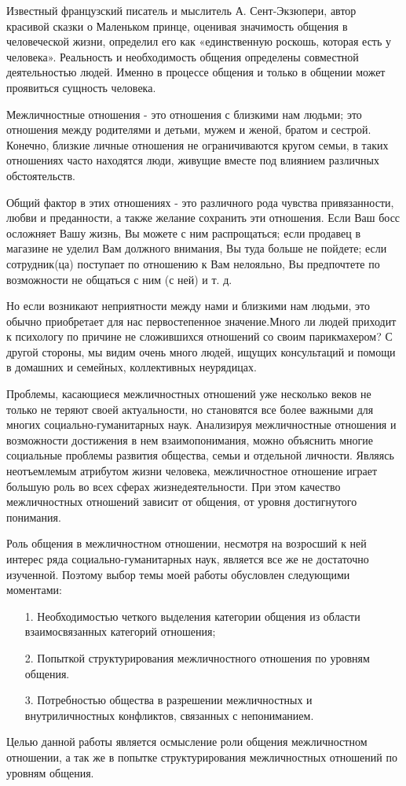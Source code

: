 Известный французский писатель и мыслитель А. Сент-Экзюпери, автор красивой сказки о Маленьком принце, оценивая значимость общения в человеческой жизни, определил его как «единственную роскошь, которая есть у человека». Реальность и необходимость общения определены совместной деятельностью людей. Именно в процессе общения и только в общении может проявиться сущность человека.

Межличностные отношения - это отношения с близкими нам людьми; это отношения между родителями и детьми, мужем и женой, братом и сестрой. Конечно, близкие личные отношения не ограничиваются кругом семьи, в таких отношениях часто находятся люди, живущие вместе под влиянием различных обстоятельств. \cite{3}

Общий фактор в этих отношениях - это различного рода чувства привязанности, любви и преданности, а также желание сохранить эти отношения. Если Ваш босс осложняет Вашу жизнь, Вы можете с ним распрощаться; если продавец в магазине не уделил Вам должного внимания, Вы туда больше не пойдете; если сотрудник(ца) поступает по отношению к Вам нелояльно, Вы предпочтете по возможности не общаться с ним (с ней) и т. д. 

Но если возникают неприятности между нами и близкими нам людьми, это обычно приобретает для нас первостепенное значение.Много ли людей приходит к психологу по причине не сложившихся отношений со своим парикмахером? С другой стороны, мы видим очень много людей, ищущих консультаций и помощи в домашних и семейных, коллективных неурядицах. 

Проблемы, касающиеся межличностных отношений уже несколько веков не только не теряют своей актуальности, но становятся все более важными для многих социально-гуманитарных наук. Анализируя межличностные отношения и возможности достижения в нем взаимопонимания, можно объяснить многие социальные проблемы развития общества, семьи и отдельной личности. Являясь неотъемлемым атрибутом жизни человека, межличностное отношение играет большую роль во всех сферах жизнедеятельности. При этом качество межличностных отношений зависит от общения, от уровня достигнутого понимания. 

Роль общения в межличностном отношении, несмотря на возросший к ней интерес ряда социально-гуманитарных наук, является все же не достаточно изученной. Поэтому выбор темы моей работы обусловлен следующими моментами: 
\begin{enumerate}
	\item[1.] Необходимостью четкого выделения категории общения из области взаимосвязанных категорий отношения; 
	\item[2.] Попыткой структурирования межличностного отношения по уровням общения. 
	\item[3.] Потребностью общества в разрешении межличностных и внутриличностных конфликтов, связанных с непониманием. 
\end{enumerate}

Целью данной работы является осмысление роли общения межличностном отношении, а так же в попытке структурирования межличностных отношений по уровням общения. 
